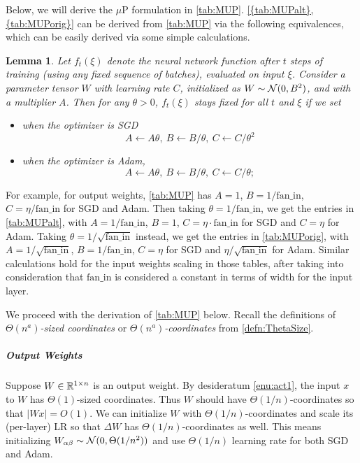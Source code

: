 \documentclass{article}
\newtheorem{lem}[thm]{Lemma}
\theoremstyle{definition}
\newcommand{\fanin}{\mathrm{fan\_in}}
\begin{document}
    Below, we will derive the $\mu$P formulation in \cref{tab:MUP}.
    \cref{{tab:MUPalt},{tab:MUPorig}} can be derived from \cref{tab:MUP} via the following equivalences, which can be easily derived via some simple calculations.

    \begin{lem}\label{lem:scalingEquivalences}
      Let $f_t(\xi)$ denote the neural network function after $t$ steps of training (using any fixed sequence of batches), evaluated on input $\xi$.
      Consider a parameter tensor $W$ with learning rate $C$, initialized as $W \sim \mathcal{N}(0, B^2)$, and with a multiplier $A$. Then for any $\theta > 0$, $f_t(\xi)$ stays fixed for all $t$ and $\xi$ if we set 
      \begin{itemize}
        \item when the optimizer is SGD
        \[
          A \gets A \theta,\ B \gets B / \theta,\ C \gets C / \theta^2
        \]
        \item when the optimizer is Adam, 
        \[
          A \gets A \theta,\ B \gets B / \theta,\ C \gets C / \theta;
        \]
      \end{itemize}
    \end{lem}

    For example, for output weights, \cref{tab:MUP} has $A = 1$, $B = 1/\fanin$, $C = \eta/\fanin$ for SGD and Adam.
    Then taking $\theta = 1/\fanin$, we get the entries in \cref{tab:MUPalt}, with $A=1/\fanin$, $B=1$, $C = \eta \cdot \fanin$ for SGD and $C = \eta$ for Adam.
    Taking $\theta = 1/\sqrt{\fanin}$ instead, we get the entries in \cref{tab:MUPorig}, with $A = 1/\sqrt{\fanin}$, $B = 1/\fanin$, $C = \eta$ for SGD and $\eta/\sqrt{\fanin}$ for Adam.
    Similar calculations hold for the input weights scaling in those tables, after taking into consideration that $\fanin$ is considered a constant in terms of width for the input layer.

    We proceed with the derivation of \cref{tab:MUP} below.
    Recall the definitions of \emph{$\Theta(n^a)$-sized coordinates} or \emph{$\Theta(n^a)$-coordinates} from \cref{defn:ThetaSize}.
    
    \subparagraph*{Output Weights}
    
    Suppose $W\in\mathbb{R}^{1\times n}$ is an output weight. By desideratum \ref{enu:act1}, the input $x$ to $W$ has $\Theta(1)$-sized coordinates. Thus $W$ should have $\Theta(1/n)$-coordinates so that $|Wx|=O(1)$. We can initialize $W$ with $\Theta(1/n)$-coordinates and scale its (per-layer) LR so that $\Delta W$ has $\Theta(1/n)$-coordinates as well.
    This means initializing $W_{\alpha\beta} \sim \mathcal{N}(0, \Theta(1/n^2))$ and use $\Theta(1/n)$ learning rate for both SGD and Adam.
    
\end{document}
